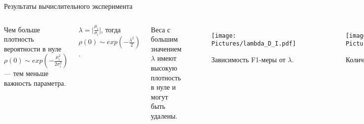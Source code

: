 \documentclass{beamer}
\begin{document}
\begin{frame}{Результаты вычислительного эксперимента}
	
\begin{columns}
	\column{6cm}
	
	
	Чем больше плотность вероятности в нуле $\rho(0) \sim exp(-\frac{\mu_i^2}{2\sigma_i^2})$ --- тем меньше важность параметра.
	
	$\lambda = \big|\frac{\mu_i}{\sigma_i}\big|$, тогда $\rho(0) \sim exp(-\frac{\lambda^2}{2})$.
	
	Веса с большим значением $\lambda$ имеют высокую плотность в нуле и могут быть удалены.	
	
	
	\begin{figure}
	\texttt{[image: Pictures/lambda\_D\_I.pdf]}
	\vspace{-0.25cm}
	\caption*{Зависимость F1-меры от $\lambda$.}
	\end{figure}
	
	\column{6cm}

	\vspace{-0.5cm}	
	\begin{figure}
	\texttt{[image: Pictures/Portion\_of\_pruned\_weights\_on\_lambda\_D\_I.pdf]}
	\vspace{-0.25cm}	
	\caption*{Количество параметров от $\lambda$.}
	\end{figure}
	
	\vspace{-1.25cm}
	
	\begin{figure}
	\texttt{[image: Pictures/pruning\_evidence\_D\_I.pdf]}
	\vspace{-0.25cm}	
	\caption*{Зависимость правдоподобия от $\lambda$.}
	\end{figure}
	
\end{columns}
%
%	
%	
\end{frame}
\end{document}
